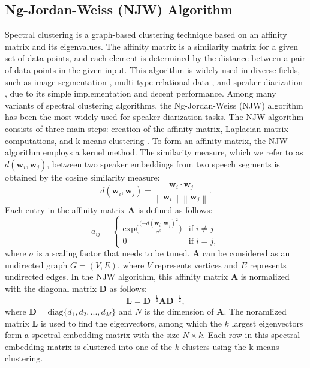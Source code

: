 \documentclass[journal]{IEEEtran}
\begin{document}
\subsection{Ng-Jordan-Weiss (NJW) Algorithm}
\label{spectral_clustering_framework}
Spectral clustering is a graph-based clustering technique based on an affinity matrix and its eigenvalues. The affinity matrix is a similarity matrix for a given set of data points, and each element is determined by the distance between a pair of data points in the given input. This algorithm is widely used in diverse fields, such as image segmentation \cite{zelnik2005self}, multi-type relational data \cite{long2006spectral}, and speaker diarization \cite{ning2006spectral, luque2012, shum2012use, shum2013unsupervised, wang2018speaker, qingjian2019}, due to its simple implementation and decent performance. Among many variants of spectral clustering algorithms, the Ng-Jordan-Weiss (NJW) algorithm \cite{ng2002spectral} has been the most widely used for speaker diarization tasks. The NJW algorithm consists of three main steps: creation of the affinity matrix, Laplacian matrix computations, and k-means clustering \cite{lloyd1982least}. To form an affinity matrix, the NJW algorithm employs a kernel method. The similarity measure, which we refer to as $d(\mathbf{w}_i, \mathbf{w}_j)$, between two speaker embeddings from two speech segments is obtained by the cosine similarity measure:
\begin{equation}
\label{eq:cos_sim}
    d(\mathbf{w}_i, \mathbf{w}_j) = \frac{\mathbf{w}_i \cdot \mathbf{w}_j}{\left\lVert \mathbf{w}_i \right\rVert \left\lVert \mathbf{w}_j \right\rVert} .
\end{equation}
Each entry in the affinity matrix $\mathbf{A}$ is defined as follows:
\begin{equation}
a_{ij}=
\begin{cases}
    \text{exp}\big(\frac{(-d(\mathbf{w}_i, \mathbf{w}_j)^{2}}{\sigma^{2}}\big) & \text{if}\; i \neq j \\ 
    0 & \text{if}\; i=j, 
\end{cases}
\end{equation}
where $\sigma$ is a scaling factor that needs to be tuned. $\mathbf{A}$ can be considered as an undirected graph $G=(V,E)$, where $V$ represents vertices and $E$ represents undirected edges. In the NJW algorithm, this affinity matrix $\mathbf{A}$ is normalized with the diagonal matrix $\mathbf{D}$ as follows:
\begin{equation}
    \mathbf{L} = \mathbf{D}^{-\frac{1}{2}} \mathbf{A} \mathbf{D}^{-\frac{1}{2}},
\end{equation}
where $\mathbf{D} = \textrm{diag} \{ d_1, d_2, ..., d_M \}$ and $N$ is the dimension of $\mathbf{A}$. The noramlized matrix $\mathbf{L}$ is used to find the eigenvectors, among which the $k$ largest eigenvectors form a spectral embedding matrix with the size $N \times k$. Each row in this spectral embedding matrix is clustered into one of the $k$ clusters using the k-means clustering. 
\vspace{-1ex}
\end{document}
